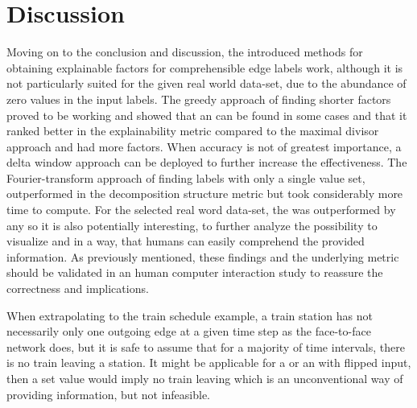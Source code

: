 
\chapter{Discussion}
\label{ch:Discussion}
Moving on to the conclusion and discussion, the introduced methods for obtaining explainable factors for comprehensible edge labels work, although it is not particularly suited for the given real world data-set, due to the abundance of zero values in the input labels.
The greedy approach of finding shorter factors proved to be working and showed that an \orDecomp can be found in some cases and that it ranked better in the explainability metric compared to the maximal divisor approach and had more factors.
When accuracy is not of greatest importance, a delta window approach can be deployed to further increase the effectiveness.
The Fourier-transform approach of finding labels with only a single value set, outperformed in the decomposition structure metric but took considerably more time to compute.
For the selected real word data-set, the \orDecomp was outperformed by any \andDecomp so it is also potentially interesting, to further analyze the possibility to visualize and \andDecomp in a way, that humans can easily comprehend the provided information.
As previously mentioned, these findings and the underlying metric should be validated in an human computer interaction study to reassure the correctness and implications. 

When extrapolating to the train schedule example, a train station has not necessarily only one outgoing edge at a given time step as the face-to-face network does, but it is safe to assume that for a majority of time intervals, there is no train leaving a station.
It might be applicable for a \andDecomp or an \orDecomp with flipped input, then a set value would imply no train leaving which is an unconventional way of providing information, but not infeasible.

